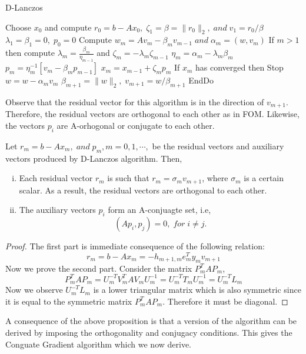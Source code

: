 \documentclass[10pt,a4paper]{article}
\begin{document}
\begin{algorithm}
\caption{D-Lanczos}
\begin{algorithmic}[1]
\State Choose $x_0$ and compute $r_0=b-Ax_0,\;\zeta_1=\beta=\|r_0\|_2,\;and\;v_1=r_0/\beta$
\State $\lambda_1=\beta_1=0,\;p_0=0$
	\State Compute $w_m = Av_m-\beta_mv_{m-1}\;and\;\alpha_m=(w,v_m)$
	\State If $m > 1$ then compute $\lambda_m=\frac{\beta_m}{\eta_{m-1}}$ and $\zeta_m=-\lambda_m\zeta_{m-1}$
	\State $\eta_m=\alpha_m-\lambda_m\beta_m$
	\State $p_m = \eta^{-1}_m[v_m-\beta_mp_{m-1}]$
	\State $x_m=x_{m-1}+\zeta_mp_m$
	\State If $x_m$ has converged then Stop
	\State $w=w-\alpha_mv_m$
	\State $\beta_{m+1}=\|w\|_2,\;v_{m+1}=w/\beta_{m+1}$
\EndFor
\State EndDo
\end{algorithmic}
\end{algorithm}

Observe that the residual vector for this algorithm is in the direction of $v_{m+1}.$ Therefore, the residual vectors are orthogonal to each other as in FOM. Likewise, the vectors $p_i$ are A-orhogonal or conjugate to each other.

\begin{prop}
Let $r_m=b-Ax_m,\;and\;p_m,m=0,1,\cdots,$ be the residual vectors and auxiliary vectors produced by D-Lanczos algorithm. Then,
\begin{enumerate}[i)]
\item Each residual vector $r_m$ is such that $r_m=\sigma_{m}v_{m+1}$, where $\sigma_m$ is a certain scalar. As a result, the residual vectors are orthogonal to each other.
\item The auxiliary vectors $p_i$ form an A-conjuagte set, i.e,
$$(Ap_i,p_j)=0,\;for\;i\neq j.$$
\end{enumerate}
\end{prop}

\begin{proof}
The first part is immediate consequence of the following relation:
$$r_m=b-Ax_m=-h_{m+1,m}e^T_my_mv_{m+1}$$
Now we prove the second part. Consider the matrix $P^T_mAP_m$,
$$P^T_mAP_m = U^{-T}_mV^T_mAV_mU^{-1}_m = U^{-T}_mT_mU^{-1}_m = U^{-T}_mL_m$$
Now we observe $U^{-T}_mL_m$ is a lower triangular matrix which is also symmetric since it is equal to the symmetric matrix $P^T_mAP_m$. Therefore it must be diagonal.
\end{proof}

A consequence of the above proposition is that a version of the algorithm  can be derived by imposing the orthogonality and conjugacy conditions. This gives the Conguate Gradient algorithm which we now derive. 
\end{document}
